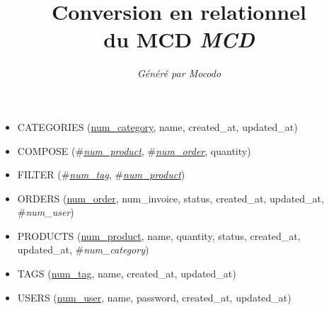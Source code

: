 \documentclass[a4paper]{article}
\title{Conversion en relationnel\\du MCD \emph{MCD}}
\author{\emph{Généré par Mocodo}}
\newcommand{\relat}[1]{\textsc{#1}}
\newcommand{\attr}[1]{#1}
\newcommand{\prim}[1]{\uline{#1}}
\newcommand{\foreign}[1]{\#\textsl{#1}}
\begin{document}
\maketitle

\begin{itemize}
  \item \relat{CATEGORIES} (\prim{num_category}, \attr{name}, \attr{created_at}, \attr{updated_at})
  \item \relat{COMPOSE} (\foreign{\prim{num_product}}, \foreign{\prim{num_order}}, \attr{quantity})
  \item \relat{FILTER} (\foreign{\prim{num_tag}}, \foreign{\prim{num_product}})
  \item \relat{ORDERS} (\prim{num_order}, \attr{num_invoice}, \attr{status}, \attr{created_at}, \attr{updated_at}, \foreign{num_user})
  \item \relat{PRODUCTS} (\prim{num_product}, \attr{name}, \attr{quantity}, \attr{status}, \attr{created_at}, \attr{updated_at}, \foreign{num_category})
  \item \relat{TAGS} (\prim{num_tag}, \attr{name}, \attr{created_at}, \attr{updated_at})
  \item \relat{USERS} (\prim{num_user}, \attr{name}, \attr{password}, \attr{created_at}, \attr{updated_at})
\end{itemize}
\end{document}
